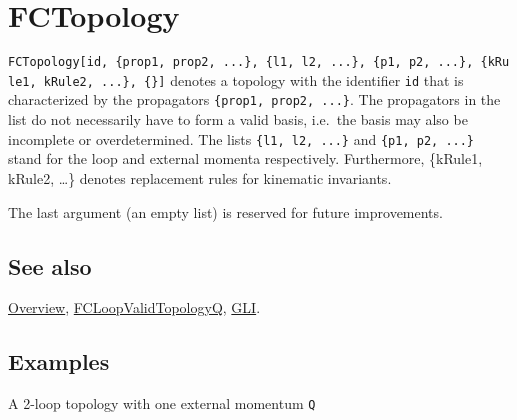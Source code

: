 \documentclass[../FeynCalcManual.tex]{subfiles}
\begin{document}
\hypertarget{fctopology}{
\section{FCTopology}\label{fctopology}}

\texttt{FCTopology[\allowbreak{}id,\ \allowbreak{}\{\allowbreak{}prop1,\ \allowbreak{}prop2,\ \allowbreak{}...\},\ \allowbreak{}\{\allowbreak{}l1,\ \allowbreak{}l2,\ \allowbreak{}...\},\ \allowbreak{}\{\allowbreak{}p1,\ \allowbreak{}p2,\ \allowbreak{}...\},\ \allowbreak{}\{\allowbreak{}kRule1,\ \allowbreak{}kRule2,\ \allowbreak{}...\},\ \allowbreak{}\{\allowbreak{}\}]}
denotes a topology with the identifier \texttt{id} that is characterized
by the propagators
\texttt{\{\allowbreak{}prop1,\ \allowbreak{}prop2,\ \allowbreak{}...\}}.
The propagators in the list do not necessarily have to form a valid
basis, i.e.~the basis may also be incomplete or overdetermined. The
lists \texttt{\{\allowbreak{}l1,\ \allowbreak{}l2,\ \allowbreak{}...\}}
and \texttt{\{\allowbreak{}p1,\ \allowbreak{}p2,\ \allowbreak{}...\}}
stand for the loop and external momenta respectively. Furthermore,
\{kRule1, kRule2, \ldots\} denotes replacement rules for kinematic
invariants.

The last argument (an empty list) is reserved for future improvements.

\subsection{See also}

\hyperlink{toc}{Overview},
\hyperlink{fcloopvalidtopologyq}{FCLoopValidTopologyQ},
\hyperlink{gli}{GLI}.

\subsection{Examples}

A 2-loop topology with one external momentum \texttt{Q}

\begin{Shaded}
\begin{Highlighting}[]
\OperatorTok{[}\OperatorTok{,} \OperatorTok{\{}\OperatorTok{[}\OperatorTok{],}\OperatorTok{[}\OperatorTok{],}\OperatorTok{[} \SpecialCharTok{{-}}\SpecialCharTok{{-}}\OperatorTok{],}\OperatorTok{[} \SpecialCharTok{{-}}\OperatorTok{],}\OperatorTok{[} \SpecialCharTok{{-}}\OperatorTok{]\},} \OperatorTok{\{}\OperatorTok{,}\OperatorTok{\},} \OperatorTok{\{}\OperatorTok{\},} \OperatorTok{\{\},} \OperatorTok{\{\}]}
\end{Highlighting}
\end{Shaded}
\end{document}
